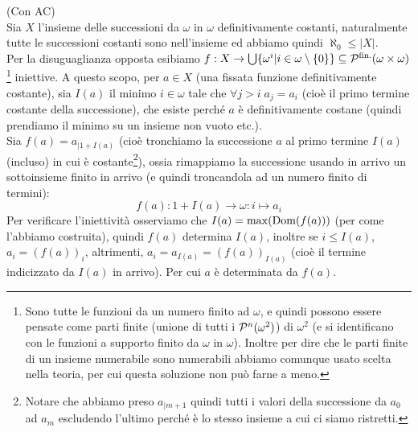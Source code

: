 \begin{soln}
	(Con AC)\\
	Sia $X$ l'insieme delle successioni da $\omega$ in $\omega$ definitivamente costanti, naturalmente tutte le successioni costanti sono nell'insieme ed abbiamo quindi $\aleph_0 \leq |X|$.\\
	Per la disuguaglianza opposta esibiamo $f : X \to \bigcup\{\omega^i | i \in \omega\setminus\{0\}\} \subseteq \mathcal{P}^{\text{fin.}}(\omega \times \omega)$\footnote{Sono tutte le funzioni da un numero finito ad $\omega$, e quindi possono essere pensate come parti finite (unione di tutti i $\mathcal{P}^{n}(\omega^2)$) di $\omega^2$ (e si identificano con le funzioni a supporto 
	finito da $\omega$ in $\omega$). Inoltre per dire che le parti finite di un insieme numerabile sono numerabili abbiamo comunque usato scelta nella teoria, per cui questa soluzione non può farne a meno.} iniettive. A questo scopo, per $a \in X$ (una fissata funzione definitivamente costante), sia $I(a)$ il minimo $i \in \omega$ tale che $\forall j > i \; a_j = a_i$ (cioè il primo termine costante della successione), che esiste perché $a$ è definitivamente costane (quindi prendiamo il minimo su un insieme non vuoto etc.).\\
	Sia $f(a) = a_{|1+I(a)}$ (cioè tronchiamo la successione $a$ al primo termine $I(a)$ (incluso) in cui è costante\footnote{Notare che abbiamo preso $a_{|m+1}$ quindi tutti i valori della successione da $a_0$ ad $a_m$ escludendo l'ultimo perché è lo stesso insieme a cui ci siamo ristretti.}), ossia rimappiamo la successione usando in arrivo un sottoinsieme finito in arrivo (e quindi troncandola ad un numero finito di termini):
	\[  f(a) : 1 + I(a) \to \omega : i \mapsto a_i
		\]
	Per verificare l'iniettività osserviamo che $I(a) = \max(\operatorname{Dom}(f(a)))$ (per come l'abbiamo costruita), quindi $f(a)$ determina $I(a)$, inoltre se $i \leq I(a)$, $a_i = (f(a))_i$, altrimenti, $a_i = a_{I(a)} = (f(a))_{I(a)}$ (cioè il termine indicizzato da $I(a)$ in arrivo). Per cui $a$ è determinata da $f(a)$.
\end{soln}

